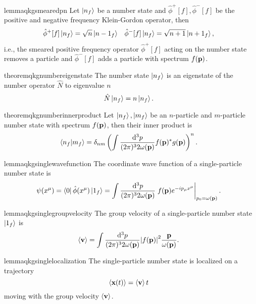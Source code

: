 \begin{restatable}{lemma}{qkgsmearedpn}\label{thm:qkg_smeared_pn}
	Let $\ket{n_f}$ be a number state and $\hat\phi^+[f],\hat\phi^-[f]$ be the positive and negative frequency Klein-Gordon operator, then
	\begin{align}
		\hat\phi^+[f]
		\ket{n_f}
		=
		\sqrt{n}
		\ket{n-1_f}
		&&
		\hat\phi^-[f]
		\ket{n_f}
		=
		\sqrt{n+1}
		\ket{n+1_f}
		,
	\end{align}
	i.e., the smeared positive frequency operator $\hat\phi^+[f]$ acting on the number state removes a particle and $\hat\phi^-[f]$ adds a particle with spectrum $f(\vb{p})$.
\end{restatable}
\begin{restatable}{theorem}{qkgnumbereigenstate}\label{thm:qkg_number_state_eigenstate}
	The number state $\ket{n_f}$ is an eigenstate of the number operator $\hat{N}$ to eigenvalue $n$
	\begin{equation}
		\hat{N}
		\ket{n_f}
		=
		n
		\ket{n_f}
		.
	\end{equation}
\end{restatable}
\begin{restatable}{theorem}{qkgnumberinnerproduct}\label{thm:qkg_number_state_inner_product}
	Let $\ket{n_f},\ket{m_f}$ be an $n$-particle and $m$-particle number state with spectrum $f(\vb{p})$, then their inner product is
	\begin{equation}
		\braket{n_f}{m_f}
		=
		\delta_{nm}
		\left(
			\int\frac{\dd[3]{p}}{(2\pi)^32\omega(\vb{p})}
			f(\vb{p})^*
			g(\vb{p})
		\right)^n
		.
	\end{equation}
\end{restatable}

\begin{restatable}{lemma}{qkgsinglewavefunction}\label{thm:qkg_number_state_single_wave_function}
	The coordinate wave function of a single-particle number state is
	\begin{equation}
		\psi(x^\mu)
		=
		\bra{0}
		\hat\phi(x^\mu)
		\ket{1_f}
		=
		\int\frac{\dd[3]{p}}{(2\pi)^32\omega(\vb{p})}
		\eval{
			f(\vb{p})
			e^{-ip_\mu x^\mu}
		}_{p_0=\omega(\vb{p})}
		.
	\end{equation}
\end{restatable}
\begin{restatable}{lemma}{qkgsinglegroupvelocity}\label{thm:number_state_single_group_velocity}
	The group velocity of a single-particle number state $\ket{1_f}$ is
	\begin{equation}
		\expval{\vb{v}}
		=
		\int\frac{\dd[3]{p}}{(2\pi)^32\omega(\vb{p})}
		\abs{f(\vb{p})}^2
		\frac{\vb{p}}{\omega(\vb{p})}
		\label{eq:single_particle_number_state_group_velocity}
		.
	\end{equation}
\end{restatable}
\begin{restatable}{lemma}{qkgsinglelocalization}\label{thm:number_state_single_localization}
	The single-particle number state is localized on a trajectory
	\begin{equation}
		\expval{\vb{x}(t)}
		=
		\expval{\vb{v}}t
	\end{equation}
	moving with the group velocity $\expval{\vb{v}}$.
\end{restatable}

